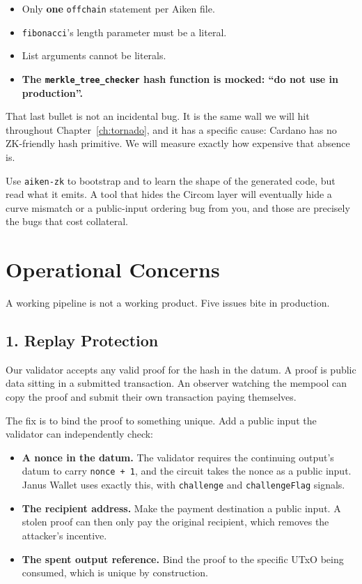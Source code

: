 \begin{itemize}
  \item Only \textbf{one} \texttt{offchain} statement per Aiken file.
  \item \texttt{fibonacci}'s length parameter must be a literal.
  \item List arguments cannot be literals.
  \item \textbf{The \texttt{merkle\_tree\_checker} hash function is mocked:
        ``do not use in production''.}
\end{itemize}

That last bullet is not an incidental bug. It is the same wall we will hit
throughout Chapter~\ref{ch:tornado}, and it has a specific cause:
Cardano has no ZK-friendly hash primitive. We will measure exactly how
expensive that absence is.

\begin{remark}
Use \texttt{aiken-zk} to bootstrap and to learn the shape of the generated
code, but read what it emits. A tool that hides the Circom layer will
eventually hide a curve mismatch or a public-input ordering bug from you, and
those are precisely the bugs that cost collateral.
\end{remark}

\section{Operational Concerns} \label{sec:ch7-ops}

A working pipeline is not a working product. Five issues bite in production.

\subsection*{1. Replay Protection}

Our validator accepts any valid proof for the hash in the datum. A proof is
public data sitting in a submitted transaction. An observer watching the mempool
can copy the proof and submit their own transaction paying themselves.

The fix is to bind the proof to something unique. Add a public input the
validator can independently check:

\begin{itemize}
  \item \textbf{A nonce in the datum.} The validator requires the continuing
        output's datum to carry \texttt{nonce + 1}, and the circuit takes the
        nonce as a public input. Janus Wallet uses exactly this, with
        \texttt{challenge} and \texttt{challengeFlag} signals.
  \item \textbf{The recipient address.} Make the payment destination a public
        input. A stolen proof can then only pay the original recipient, which
        removes the attacker's incentive.
  \item \textbf{The spent output reference.} Bind the proof to the specific UTxO
        being consumed, which is unique by construction.
\end{itemize}

